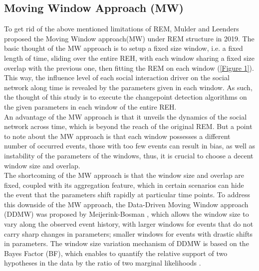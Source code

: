 \documentclass[]{interact}
\theoremstyle{plain}%
\theoremstyle{definition}
\theoremstyle{remark}
\begin{document}
\subsection{Moving Window Approach (MW)}

\hspace{0.2cm} To get rid of the above mentioned limitations of REM, Mulder and Leenders proposed the Moving Window approach(MW) under REM structure in 2019\cite{mulderModelingEvolutionInteraction2019}. The basic thought of the MW approach is to setup a fixed size window, i.e. a fixed length of time, sliding over the entire REH, with each window sharing a fixed size overlap with the previous one, then fitting the REM on each window (\autoref{Figure 1}). This way, the influence level of each social interaction driver on the social network along time is revealed by the parameters given in each window. As such, the thought of this study is to execute the changepoint detection algorithms on the given parameters in each window of the entire REH. \\ 

An advantage of the MW approach is that it unveils the dynamics of the social network across time, which is beyond the reach of the original REM. But a point to note about the MW approach is that each window possesses a different number of occurred events, those with too few events can result in bias, as well as instability of the parameters of the windows\cite{mulderModelingEvolutionInteraction2019}, thus, it is crucial to choose a decent window size and overlap. \\

The shortcoming of the MW approach is that the window size and overlap are fixed, coupled with its aggregation feature, which in certain scenarios can hide the event that the parameters shift rapidly at particular time points. To address this downside of the MW approach, the Data-Driven Moving Window approach (DDMW) was proposed by Meijerink-Bosman \cite{meijerink-bosmanDynamicRelationalEvent2022}, which allows the window size to vary along the observed event history, with larger windows for events that do not carry sharp changes in parameters; smaller windows for events with drastic shifts in parameters. The window size variation mechanism of DDMW is based on the Bayes Factor (BF), which enables to quantify the relative support of two hypotheses in the data by the ratio of two marginal likelihoods \cite{guApproximatedAdjustedFractional2018}. \\
\end{document}
